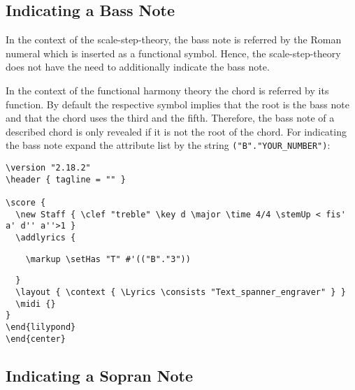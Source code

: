 \documentclass[
  DIV=calc,
  BCOR=5mm,
  12pt,
  headings=small,
  oneside,
  abstract=true,
  toc=bib,
  xcolor=dvipsnames,
  openany,
  ngerman,english]{scrartcl}
\begin{document}
\subsection{Indicating a Bass Note}

In the context of the scale-step-theory, the bass note is referred by the Roman
numeral which is inserted as a functional symbol. Hence, the  scale-step-theory
does not have the need to additionally indicate the bass note.

In the context of the functional harmony theory the chord is referred by its
function. By default the respective symbol implies that the root is the bass
note and that the chord uses the third and the fifth. Therefore, the bass note
of a described chord is only revealed if it is not the root of the chord. For
indicating the bass note expand the attribute list by the
string \texttt{("B"."YOUR\_NUMBER")}:

\begin{center}
\end{center}

\begin{scriptsize}
\begin{verbatim}
\version "2.18.2"
\header { tagline = "" }

\score {
  \new Staff { \clef "treble" \key d \major \time 4/4 \stemUp < fis' a' d'' a''>1 }
  \addlyrics { 
\end{verbatim}
{ \color{red} \verb|    \markup \setHas "T" #'(("B"."3"))| }
\begin{verbatim}    
  }
  \layout { \context { \Lyrics \consists "Text_spanner_engraver" } }
  \midi {}
}
\end{lilypond}
\end{center}
\end{verbatim}
\end{scriptsize}

\subsection{Indicating a Sopran Note}
\end{document}
